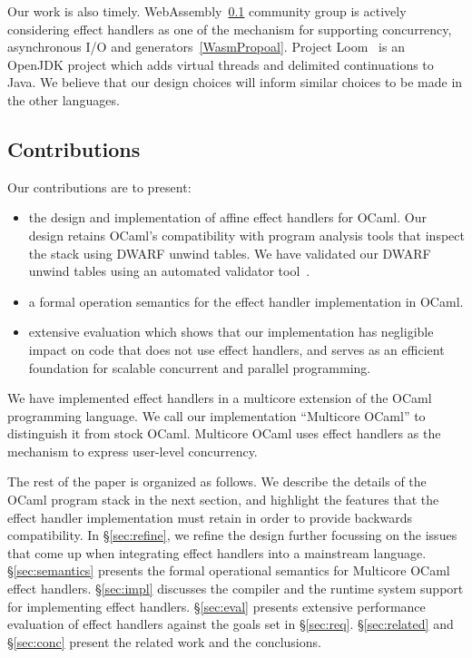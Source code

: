 \documentclass[sigplan,10pt,review,anonymous]{acmart}\settopmatter{printfolios=true,printccs=false,printacmref=false}
\begin{document}
Our work is also timely. WebAssembly~\ref{} community group is actively
considering effect handlers as one of the mechanism for supporting concurrency,
asynchronous I/O and generators~\ref{WasmPropoal}. Project Loom~\cite{} is an
OpenJDK project which adds virtual threads and delimited continuations to Java.
We believe that our design choices will inform similar choices to be made in
the other languages.

\subsection{Contributions}

Our contributions are to present:

\begin{itemize}
	\item the design and implementation of affine effect handlers for OCaml. Our
		design retains OCaml's compatibility with program analysis tools that
		inspect the stack using DWARF unwind tables. We have validated our DWARF
		unwind tables using an automated validator tool~\cite{}.
	\item a formal operation semantics for the effect handler implementation in
		OCaml.
	\item extensive evaluation which shows that our implementation has negligible
		impact on code that does not use effect handlers, and serves as an
		efficient foundation for scalable concurrent and parallel programming.
\end{itemize}

We have implemented effect handlers in a multicore extension of the OCaml
programming language. We call our implementation ``Multicore OCaml'' to
distinguish it from stock OCaml. Multicore OCaml uses effect handlers as the
mechanism to express user-level concurrency.

The rest of the paper is organized as follows. We describe the details of the
OCaml program stack in the next section, and highlight the features that the
effect handler implementation must retain in order to provide backwards
compatibility. In \S\ref{sec:refine}, we refine the design further
focussing on the issues that come up when integrating effect handlers into a
mainstream language. \S\ref{sec:semantics} presents the formal operational
semantics for Multicore OCaml effect handlers. \S\ref{sec:impl} discusses the
compiler and the runtime system support for implementing effect handlers.
\S\ref{sec:eval} presents extensive performance evaluation of effect handlers
against the goals set in \S\ref{sec:req}. \S\ref{sec:related} and
\S\ref{sec:conc} present the related work and the conclusions.
\end{document}
